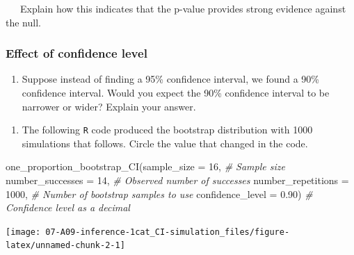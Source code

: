 \documentclass[
]{report}
\newenvironment{Shaded}{\begin{snugshade}}{\end{snugshade}}
\newcommand{\AttributeTok}[1]{\textcolor[rgb]{0.77,0.63,0.00}{#1}}
\newcommand{\CommentTok}[1]{\textcolor[rgb]{0.56,0.35,0.01}{\textit{#1}}}
\newcommand{\DecValTok}[1]{\textcolor[rgb]{0.00,0.00,0.81}{#1}}
\newcommand{\FloatTok}[1]{\textcolor[rgb]{0.00,0.00,0.81}{#1}}
\newcommand{\FunctionTok}[1]{\textcolor[rgb]{0.00,0.00,0.00}{#1}}
\newcommand{\NormalTok}[1]{#1}
\providecommand{\tightlist}{%
  \setlength{\itemsep}{0pt}\setlength{\parskip}{0pt}}
\begin{document}
\vspace{.2in}

~~~Explain how this indicates that the p-value provides strong evidence against the null.

\newpage

\hypertarget{effect-of-confidence-level}{%
\subsubsection*{Effect of confidence level}\label{effect-of-confidence-level}}

\begin{enumerate}
\def\labelenumi{\arabic{enumi}.}
\setcounter{enumi}{11}
\tightlist
\item
  Suppose instead of finding a 95\% confidence interval, we found a 90\% confidence interval. Would you expect the 90\% confidence interval to be narrower or wider? Explain your answer.
\end{enumerate}

\vspace{0.4in}

\begin{enumerate}
\def\labelenumi{\arabic{enumi}.}
\setcounter{enumi}{12}
\tightlist
\item
  The following \texttt{R} code produced the bootstrap distribution with 1000 simulations that follows. Circle the value that changed in the code.
\end{enumerate}

\begin{Shaded}
\begin{Highlighting}[]
\FunctionTok{one\_proportion\_bootstrap\_CI}\NormalTok{(}\AttributeTok{sample\_size =} \DecValTok{16}\NormalTok{, }\CommentTok{\# Sample size}
                    \AttributeTok{number\_successes =} \DecValTok{14}\NormalTok{, }\CommentTok{\# Observed number of successes}
                    \AttributeTok{number\_repetitions =} \DecValTok{1000}\NormalTok{, }\CommentTok{\# Number of bootstrap samples to use}
                    \AttributeTok{confidence\_level =} \FloatTok{0.90}\NormalTok{) }\CommentTok{\# Confidence level as a decimal}
\end{Highlighting}
\end{Shaded}

\begin{center}\texttt{[image: 07-A09-inference-1cat\_CI-simulation\_files/figure-latex/unnamed-chunk-2-1]} \end{center}
\end{document}
